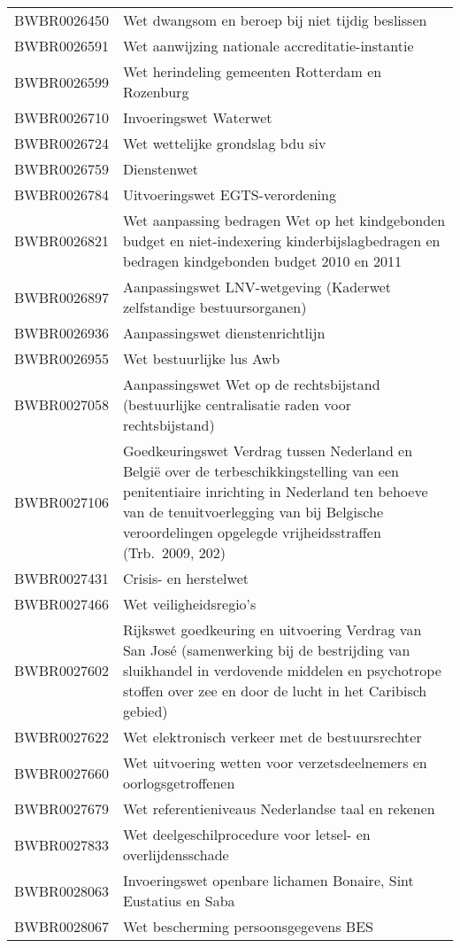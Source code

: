 \begin{longtable}{lp{}}
BWBR0026450 & Wet dwangsom en beroep bij niet tijdig beslissen \\
BWBR0026591 & Wet aanwijzing nationale accreditatie-instantie \\
BWBR0026599 & Wet herindeling gemeenten Rotterdam en Rozenburg \\
BWBR0026710 & Invoeringswet Waterwet \\
BWBR0026724 & Wet wettelijke grondslag bdu siv \\
BWBR0026759 & Dienstenwet \\
BWBR0026784 & Uitvoeringswet EGTS-verordening \\
BWBR0026821 & Wet aanpassing bedragen Wet op het kindgebonden budget en niet-indexering kinderbijslagbedragen en bedragen kindgebonden budget 2010 en 2011 \\
BWBR0026897 & Aanpassingswet LNV-wetgeving (Kaderwet zelfstandige bestuursorganen) \\
BWBR0026936 & Aanpassingswet dienstenrichtlijn \\
BWBR0026955 & Wet bestuurlijke lus Awb \\
BWBR0027058 & Aanpassingswet Wet op de rechtsbijstand (bestuurlijke centralisatie raden voor rechtsbijstand) \\
BWBR0027106 & Goedkeuringswet Verdrag tussen Nederland en België over de terbeschikkingstelling van een penitentiaire inrichting in Nederland ten behoeve van de tenuitvoerlegging van bij Belgische veroordelingen opgelegde vrijheidsstraffen (Trb. 2009, 202) \\
BWBR0027431 & Crisis- en herstelwet \\
BWBR0027466 & Wet veiligheidsregio’s \\
BWBR0027602 & Rijkswet goedkeuring en uitvoering Verdrag van San José (samenwerking bij de bestrijding van sluikhandel in verdovende middelen en psychotrope stoffen over zee en door de lucht in het Caribisch gebied) \\
BWBR0027622 & Wet elektronisch verkeer met de bestuursrechter \\
BWBR0027660 & Wet uitvoering wetten voor verzetsdeelnemers en oorlogsgetroffenen \\
BWBR0027679 & Wet referentieniveaus Nederlandse taal en rekenen \\
BWBR0027833 & Wet deelgeschilprocedure voor letsel- en overlijdensschade \\
BWBR0028063 & Invoeringswet openbare lichamen Bonaire, Sint Eustatius en Saba \\
BWBR0028067 & Wet bescherming persoonsgegevens BES  \\

\end{longtable}
